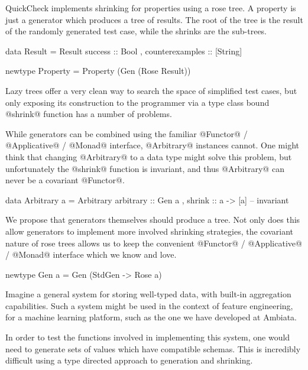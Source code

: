 QuickCheck implements shrinking for properties using a rose tree. A property is just a generator which produces a tree of results. The root of the tree is the result of the randomly generated test case, while the shrinks are the sub-trees.

\begin{code}
  data Result =
    Result {
        success         :: Bool
      , counterexamples :: [String]
      }

  newtype Property =
    Property (Gen (Rose Result))
\end{code}

Lazy trees offer a very clean way to search the space of simplified test cases, but only exposing its construction to the programmer via a type class bound @shrink@ function has a number of problems.

While generators can be combined using the familiar @Functor@ / @Applicative@ / @Monad@ interface, @Arbitrary@ instances cannot. One might think that changing @Arbitrary@ to a data type might solve this problem, but unfortunately the @shrink@ function is invariant, and thus @Arbitrary@ can never be a covariant @Functor@.

\begin{code}
  data Arbitrary a =
    Arbitrary {
        arbitrary :: Gen a
      , shrink    :: a -> [a] -- invariant
      }
\end{code}

We propose that generators themselves should produce a tree. Not only does this allow generators to implement more involved shrinking strategies, the covariant nature of rose trees allows us to keep the convenient @Functor@ / @Applicative@ / @Monad@ interface which we know and love.


\begin{code}
  newtype Gen a =
    Gen (StdGen -> Rose a)
\end{code}

Imagine a general system for storing well-typed data, with built-in aggregation capabilities. Such a system might be used in the context of feature engineering, for a machine learning platform, such as the one we have developed at Ambiata.

In order to test the functions involved in implementing this system, one would need to generate sets of values which have compatible schemas. This is incredibly difficult using a type directed approach to generation and shrinking.

